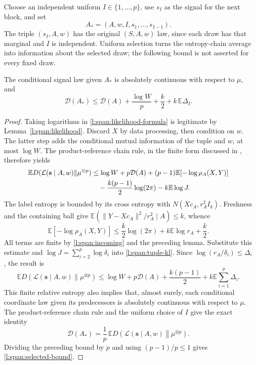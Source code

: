 Choose an independent uniform \(I\in\{1,\ldots,p\}\), use \(s_I\)
as the signal for the next block, and set
\[
 A_*=(A,w,I,s_1,\ldots,s_{I-1}).
\]
The triple \((s_I,A,w)\) has the original \((S,A,w)\) law, since
each draw has that marginal and \(I\) is independent.  Uniform
selection turns the entropy-chain average into information about
the selected draw; the following bound is not asserted for every
fixed draw.

\begin{lemma}
\label{l:span:selected}
The conditional signal law given \(A_*\) is absolutely continuous
with respect to \(\mu\), and
\begin{equation}
 \mathcal D(A_*)\le \mathcal D(A)+\frac{\log W}{p}
                    +\frac{k}{2}+k\,\mathbb E\Delta_I.
 \label{l:span:selected-bound}
\end{equation}
\end{lemma}
\begin{proof}
Taking logarithms in \eqref{l:span:likelihood-formula} is legitimate
by Lemma~\ref{l:span:likelihood}.  Discard \(X\) by data processing,
then condition on \(w\).  The latter step adds the conditional
mutual information of the tuple and \(w\), at most \(\log W\).
The product-reference chain rule, in the finite form discussed in
\cite[Section~3.3, Equations~(13)--(18)]{Austin2020}, therefore yields
\begin{align}
 \mathbb E D(\mathcal L(\mathbf s\mid A,w)\|\mu^{\otimes p})
 &\le \log W+p\mathcal D(A)
       +(p-1)\mathbb E[-\log\rho_A(X,Y)] \notag\\
 &\quad-\frac{k(p-1)}2\log(2\pi)-k\mathbb E\log J.
 \label{l:span:tuple-kl}
\end{align}
The label entropy is bounded by its cross entropy with
\(N(Xc_A,r_A^2I_k)\).  Freshness and the containing ball give
\(\mathbb E(\|Y-Xc_A\|^2/r_A^2\mid A)\le k\), whence
\[
 \mathbb E[-\log\rho_A(X,Y)]
 \le \frac{k}{2}\log(2\pi)+k\mathbb E\log r_A+\frac{k}{2}.
\]
All terms are finite by \eqref{l:span:incoming} and the preceding
lemma.  Substitute this estimate and
\(\log J=\sum_{i=2}^p\log\delta_i\) into
\eqref{l:span:tuple-kl}.  Since
\(\log(r_A/\delta_i)\le\Delta_i\), the result is
\[
 \mathbb E D(\mathcal L(\mathbf s\mid A,w)\|\mu^{\otimes p})
 \le \log W+p\mathcal D(A)+\frac{k(p-1)}2
            +k\mathbb E\sum_{i=1}^p\Delta_i.
\]
This finite relative entropy also implies that, almost surely,
each conditional coordinate law given its predecessors is
absolutely continuous with respect to \(\mu\).  The product-reference
chain rule and the uniform choice of \(I\) give the exact identity
\[
 \mathcal D(A_*)
 =\frac1p\,\mathbb E D\!\left(
     \mathcal L(\mathbf s\mid A,w)\middle\|\mu^{\otimes p}\right).
\]
Dividing the preceding bound by \(p\) and using
\((p-1)/p\le1\) gives
\eqref{l:span:selected-bound}.
\end{proof}

